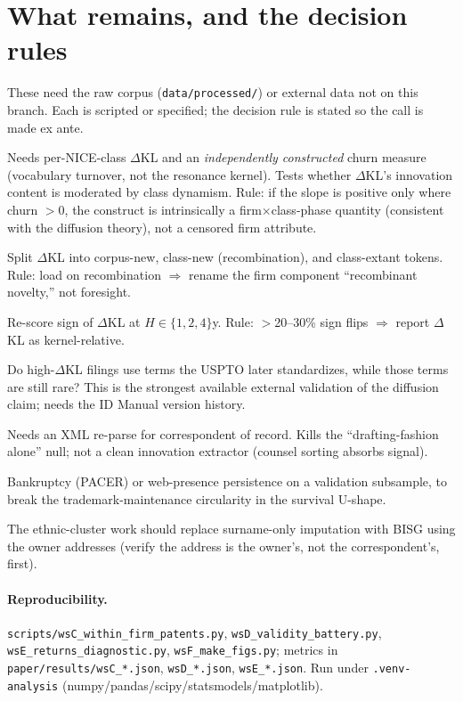 \documentclass[11pt]{article}
\newcommand{\dkl}{$\Delta$KL}
\begin{document}
\section{What remains, and the decision rules}\label{sec:blocked}
These need the raw corpus (\texttt{data/processed/}) or external data not on this
branch. Each is scripted or specified; the decision rule is stated so the call is
made ex ante.
\begin{description}[nosep,style=nextline]
\item[Interaction estimand ($\beta\times$churn).] Needs per-NICE-class \dkl{}
and an \emph{independently constructed} churn measure (vocabulary turnover, not
the resonance kernel). Tests whether \dkl{}'s innovation content is moderated by
class dynamism. Rule: if the slope is positive only where churn $>0$, the
construct is intrinsically a firm$\times$class-phase quantity (consistent with the
diffusion theory), not a censored firm attribute.
\item[Term provenance (three-way).] Split \dkl{} into corpus-new, class-new
(recombination), and class-extant tokens. Rule: load on recombination $\Rightarrow$
rename the firm component ``recombinant novelty,'' not foresight.
\item[Half-life sensitivity.] Re-score sign of \dkl{} at $H\in\{1,2,4\}$y. Rule:
$>$20--30\% sign flips $\Rightarrow$ report \dkl{} as kernel-relative.
\item[ID-Manual codification (external).] Do high-\dkl{} filings use terms the
USPTO later standardizes, while those terms are still rare? This is the strongest
available external validation of the diffusion claim; needs the ID Manual version
history.
\item[Attorney fixed effects.] Needs an XML re-parse for correspondent of record.
Kills the ``drafting-fashion alone'' null; not a clean innovation extractor
(counsel sorting absorbs signal).
\item[External survival outcome.] Bankruptcy (PACER) or web-presence persistence
on a validation subsample, to break the trademark-maintenance circularity in the
survival U-shape.
\item[BISG demographics.] The ethnic-cluster work should replace surname-only
imputation with BISG using the owner addresses (verify the address is the owner's,
not the correspondent's, first).
\end{description}

\paragraph{Reproducibility.} \texttt{scripts/wsC\_within\_firm\_patents.py},
\texttt{wsD\_validity\_battery.py}, \texttt{wsE\_returns\_diagnostic.py},
\texttt{wsF\_make\_figs.py}; metrics in \texttt{paper/results/wsC\_*.json},
\texttt{wsD\_*.json}, \texttt{wsE\_*.json}. Run under \texttt{.venv-analysis}
(numpy/pandas/scipy/statsmodels/matplotlib).
\end{document}
